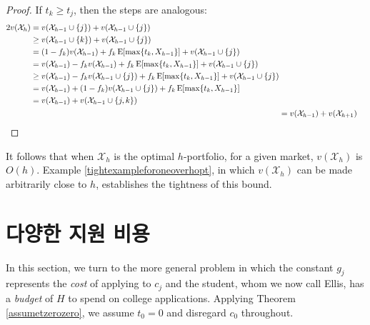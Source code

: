 \documentclass[12pt]{article} %
\newif\ifen
\theoremstyle{definition}
\newtheorem{example}{Example}
\theoremstyle{definition}
\newtheorem{example}{예}
\begin{document}
\begin{proof}
If $t_k \geq t_j$, then the steps are analogous:
\begin{align}
\begin{split}
2 v(\mathcal{X}_h) &= v(\mathcal{X}_{h-1} \cup\{j\}) + v(\mathcal{X}_{h-1} \cup\{j\}) \\
&\geq v(\mathcal{X}_{h-1} \cup\{k\}) + v(\mathcal{X}_{h-1} \cup\{j\}) \\
&= (1 - f_k) v(\mathcal{X}_{h-1}) + f_k \operatorname{E}[\max\{t_k, X_{h-1}\}] +  v(\mathcal{X}_{h-1} \cup\{j\})  \\
&= v(\mathcal{X}_{h-1}) - f_k  v(\mathcal{X}_{h-1}) + f_k \operatorname{E}[\max\{t_k, X_{h-1}\}] +  v(\mathcal{X}_{h-1} \cup\{j\})  \\
&\geq v(\mathcal{X}_{h-1}) - f_k  v(\mathcal{X}_{h-1}\cup\{j\}) + f_k \operatorname{E}[\max\{t_k, X_{h-1}\}] +  v(\mathcal{X}_{h-1} \cup\{j\})  \\
&= v(\mathcal{X}_{h-1}) + (1 - f_k) v(\mathcal{X}_{h-1}\cup\{j\}) + f_k \operatorname{E}[\max\{t_k, X_{h-1}\}]  \\
&= v(\mathcal{X}_{h-1}) + v(\mathcal{X}_{h-1} \cup\{j, k\})
\end{split}\\
&= v(\mathcal{X}_{h-1})  + v(\mathcal{X}_{h+1}) \qedhere
\end{align}
\end{proof}

It follows that when $\mathcal{X}_h$ is the optimal $h$-portfolio, for a given market, $v(\mathcal{X}_h)$ is $O(h)$. Example \ref{tightexampleforoneoverhopt}, in which $v(\mathcal{X}_h)$ can be made arbitrarily close to $h$, establishes the tightness of this bound.










\pagebreak
\ifen \section{Heterogeneous application costs} \else\section{다양한 지원 비용} \fi\label{hetappcosts}
In this section, we turn to the more general problem in which the constant $g_j$ represents the \emph{cost} of applying to $c_j$ and the student, whom we now call Ellis, has a \emph{budget} of $H$ to spend on college applications. Applying Theorem \ref{assumetzerozero}, we assume $t_0 = 0$ and disregard $c_0$ throughout.
\end{document}
